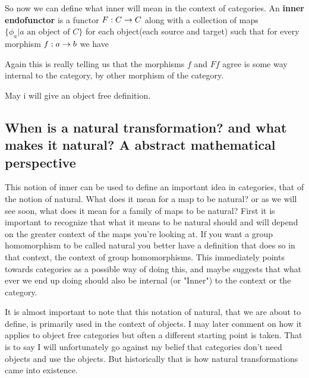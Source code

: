 \documentclass[12pt]{amsart}
\begin{document}
So now we can define what inner will mean in the context of categories. An \textbf{inner endofunctor} is a functor $F: C \rightarrow C$ 
along with a collection of maps $\{\phi_a | a\text{ an object of }C\}$ for each object(each source and target) 
such that for every morphism $f:a\rightarrow b$ we have
\begin{center}
\end{center}

Again this is really telling us that the morphisms $f$ and $Ff$ agree is some way internal to the category, by other morphism of the category.

May i will give an object free definition.


\subsection{When is a natural transformation? and what makes it natural? A abstract mathematical perspective}
This notion of inner can be used to define an important idea in categories, that of the notion of natural.
What does it mean for a map to be natural? or as we will see soon, what does it mean for a family of maps to be natural?
First it is important to recognize that what it means to be natural should and will depend on the greater context of the maps you're looking at.
If you want a group homomorphism to be called natural you better have a definition that does so in that context, the context of group homomorphisms. This immediately 
points towards categories as a possible way of doing this, and maybe suggests that what ever we end up doing should also be internal (or "Inner") 
to the context or the category. 


It is almost important to note that this notation of natural, that we are about to define, is primarily used in the context of objects. I may 
later comment on how it applies to object free categories but often a different starting point is taken.
That is to say I will unfortunately go against my belief that categories don't need objects and use the objects. But historically that is how natural transformations 
came into existence.
\end{document}
